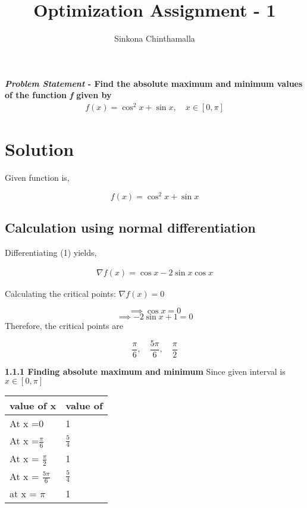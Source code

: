 \documentclass[10pt,twocolumn]{article}
\title{\textbf{Optimization Assignment - 1}}
\author{Sinkona Chinthamalla}
\begin{document}
\maketitle
\paragraph{\textit{Problem Statement} - Find the absolute maximum and minimum values of the function \emph{f} given by 
\begin{align*}
f(x) = \cos^2x + \sin x,\quad x \in [0,\pi] 
\end{align*}} 

\section{Solution}
\begin{flushleft}
Given function is,\\
\end{flushleft}
\begin{equation}
    f(x)=\cos^2x + \sin x
\end{equation}
\subsection{Calculation using normal differentiation}
\begin{flushleft}
Differentiating (1) yields,
\end{flushleft}
\begin{align}
\nabla f(x) = \cos x-2\sin x \cos x 
\end{align}

\noindent Calculating the critical points:
$ \nabla f(x) = 0 $

\begin{equation}
\implies \cos{x} = 0 
\end{equation}
\begin{equation}
\implies -2\sin{x} + 1 = 0
\end{equation}
Therefore, the critical points are 

\begin{equation}
\frac{\pi}{6},\quad\frac{5\pi}{6},\quad\frac{\pi}{2}
\end{equation}

\textbf{1.1.1 Finding absolute maximum and minimum} 
Since given interval is $x \in [0,\pi]$ 

\begin{table}[h]
\centering
\large
\begin{tabular}{|l|l|}
\hline
\textbf{value of x} & \textbf{value of} \\ \hline
At x =0             & 1                 \\ \hline
At x =$ \frac{\pi}{6}$            & $\frac{5}{4}$            \\ \hline
At x =  $ \frac{\pi}{2}$            & 1                 \\ \hline
At x =  $ \frac{5\pi}{6}$            & $\frac{5}{4}$             \\ \hline
at x =       $\pi$       & 1                 \\ \hline
\end{tabular}
\end{table}
\end{document}
